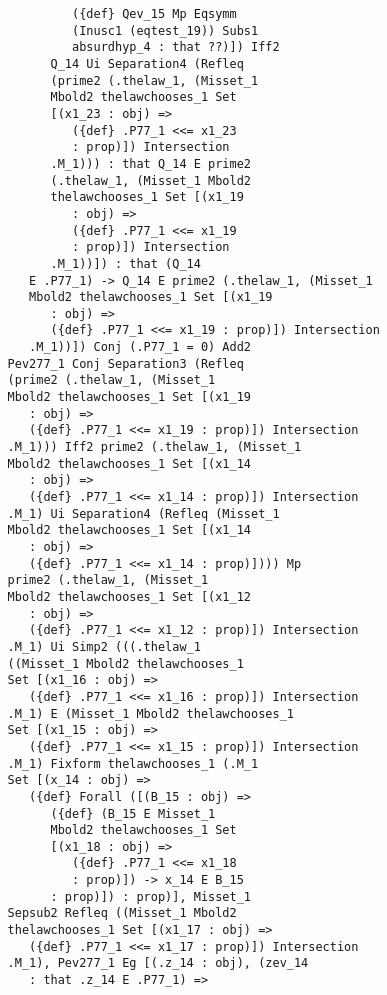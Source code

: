 \documentclass[12pt]{article}
\begin{document}
\begin{verbatim}
                   ({def} Qev_15 Mp Eqsymm 
                   (Inusc1 (eqtest_19)) Subs1 
                   absurdhyp_4 : that ??)]) Iff2 
                Q_14 Ui Separation4 (Refleq 
                (prime2 (.thelaw_1, (Misset_1 
                Mbold2 thelawchooses_1 Set 
                [(x1_23 : obj) => 
                   ({def} .P77_1 <<= x1_23 
                   : prop)]) Intersection 
                .M_1))) : that Q_14 E prime2 
                (.thelaw_1, (Misset_1 Mbold2 
                thelawchooses_1 Set [(x1_19 
                   : obj) => 
                   ({def} .P77_1 <<= x1_19 
                   : prop)]) Intersection 
                .M_1))]) : that (Q_14 
             E .P77_1) -> Q_14 E prime2 (.thelaw_1, (Misset_1 
             Mbold2 thelawchooses_1 Set [(x1_19 
                : obj) => 
                ({def} .P77_1 <<= x1_19 : prop)]) Intersection 
             .M_1))]) Conj (.P77_1 = 0) Add2 
          Pev277_1 Conj Separation3 (Refleq 
          (prime2 (.thelaw_1, (Misset_1 
          Mbold2 thelawchooses_1 Set [(x1_19 
             : obj) => 
             ({def} .P77_1 <<= x1_19 : prop)]) Intersection 
          .M_1))) Iff2 prime2 (.thelaw_1, (Misset_1 
          Mbold2 thelawchooses_1 Set [(x1_14 
             : obj) => 
             ({def} .P77_1 <<= x1_14 : prop)]) Intersection 
          .M_1) Ui Separation4 (Refleq (Misset_1 
          Mbold2 thelawchooses_1 Set [(x1_14 
             : obj) => 
             ({def} .P77_1 <<= x1_14 : prop)]))) Mp 
          prime2 (.thelaw_1, (Misset_1 
          Mbold2 thelawchooses_1 Set [(x1_12 
             : obj) => 
             ({def} .P77_1 <<= x1_12 : prop)]) Intersection 
          .M_1) Ui Simp2 (((.thelaw_1 
          ((Misset_1 Mbold2 thelawchooses_1 
          Set [(x1_16 : obj) => 
             ({def} .P77_1 <<= x1_16 : prop)]) Intersection 
          .M_1) E (Misset_1 Mbold2 thelawchooses_1 
          Set [(x1_15 : obj) => 
             ({def} .P77_1 <<= x1_15 : prop)]) Intersection 
          .M_1) Fixform thelawchooses_1 (.M_1 
          Set [(x_14 : obj) => 
             ({def} Forall ([(B_15 : obj) => 
                ({def} (B_15 E Misset_1 
                Mbold2 thelawchooses_1 Set 
                [(x1_18 : obj) => 
                   ({def} .P77_1 <<= x1_18 
                   : prop)]) -> x_14 E B_15 
                : prop)]) : prop)], Misset_1 
          Sepsub2 Refleq ((Misset_1 Mbold2 
          thelawchooses_1 Set [(x1_17 : obj) => 
             ({def} .P77_1 <<= x1_17 : prop)]) Intersection 
          .M_1), Pev277_1 Eg [(.z_14 : obj), (zev_14 
             : that .z_14 E .P77_1) => 

\end{verbatim}
\end{document}
